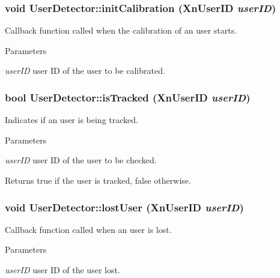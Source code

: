 \hypertarget{classUserDetector_a34432616a52932934e8799f90aefc65a}{
\subsubsection[{initCalibration}]{\setlength{\rightskip}{0pt plus 5cm}void UserDetector::initCalibration (XnUserID {\em userID})}}
\label{classUserDetector_a34432616a52932934e8799f90aefc65a}
Callback function called when the calibration of an user starts. 
\begin{DoxyParams}{Parameters}
\item[{\em userID}]user ID of the user to be calibrated. \end{DoxyParams}
\hypertarget{classUserDetector_a0df3aaf4a4034358934cbc4f057b5c8f}{
\subsubsection[{isTracked}]{\setlength{\rightskip}{0pt plus 5cm}bool UserDetector::isTracked (XnUserID {\em userID})}}
\label{classUserDetector_a0df3aaf4a4034358934cbc4f057b5c8f}
Indicates if an user is being tracked. 
\begin{DoxyParams}{Parameters}
\item[{\em userID}]user ID of the user to be checked. \end{DoxyParams}
\begin{DoxyReturn}{Returns}
true if the user is tracked, false otherwise. 
\end{DoxyReturn}
\hypertarget{classUserDetector_a486ca42bbdc01ef853c82b36cda7cc84}{
\subsubsection[{lostUser}]{\setlength{\rightskip}{0pt plus 5cm}void UserDetector::lostUser (XnUserID {\em userID})}}
\label{classUserDetector_a486ca42bbdc01ef853c82b36cda7cc84}
Callback function called when an user is lost. 
\begin{DoxyParams}{Parameters}
\item[{\em userID}]user ID of the user lost. \end{DoxyParams}


